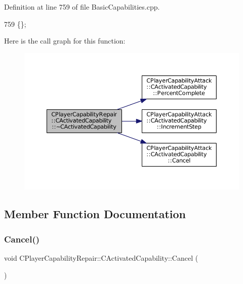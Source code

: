 Definition at line 759 of file Basic\+Capabilities.\+cpp.


\begin{DoxyCode}
759 \{\};
\end{DoxyCode}
Here is the call graph for this function\+:\nopagebreak
\begin{figure}[H]
\begin{center}
\leavevmode
\includegraphics[width=350pt]{classCPlayerCapabilityRepair_1_1CActivatedCapability_ae4c632553e0898f8501a3f6bcd71cfaa_cgraph}
\end{center}
\end{figure}


\subsection{Member Function Documentation}
\hypertarget{classCPlayerCapabilityRepair_1_1CActivatedCapability_a719cee3446291470987f504739f63215}{}\label{classCPlayerCapabilityRepair_1_1CActivatedCapability_a719cee3446291470987f504739f63215} 
\subsubsection{\texorpdfstring{Cancel()}{Cancel()}}
{\footnotesize\ttfamily void C\+Player\+Capability\+Repair\+::\+C\+Activated\+Capability\+::\+Cancel (\begin{DoxyParamCaption}{ }\end{DoxyParamCaption})\hspace{0.3cm}{\ttfamily [virtual]}}




